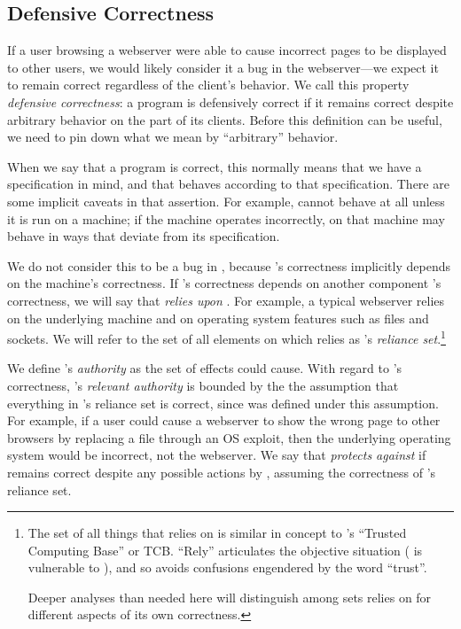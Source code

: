 \documentclass{llncs}
\begin{document}
\subsection{Defensive Correctness}

If a user browsing a webserver were able to cause incorrect pages to
be displayed to other users, we would likely consider it a bug in the
webserver---we expect it to remain correct regardless of the client's
behavior.  We call this property \emph{defensive correctness}: a
program  is defensively correct if it remains correct despite
arbitrary behavior on the part of its clients.  Before this definition
can be useful, we need to pin down what we mean by ``arbitrary''
behavior.

When we say that a program  is correct, this normally means
that we have a specification in mind, and that  behaves
according to that specification.  There are some implicit caveats in
that assertion. For example,  cannot behave at all unless it
is run on a machine; if the machine operates incorrectly,  on
that machine may behave in ways that deviate from its specification.

We do not consider this to be a bug in , because 's
correctness implicitly depends on the machine's correctness.  If
's correctness depends on another component 's
correctness, we will say that  \emph{relies upon} .
For example, a typical webserver relies on the underlying machine and
on operating system features such as files and sockets.  We will refer
to the set of all elements on which  relies as 's
\emph{reliance set}.\footnote{
%
     The set of all things that  relies on is similar in
     concept to 's ``Trusted Computing Base'' or TCB. ``Rely''
     articulates the objective situation ( is vulnerable to
     ), and so avoids confusions engendered by the word
     ``trust''.
     
     Deeper analyses than needed here will distinguish among sets
      relies on for different aspects of its own correctness.}

We define 's \emph{authority} as the set of effects 
could cause.  With regard to 's correctness, 's
\emph{relevant authority} is bounded by the the assumption that
everything in 's reliance set is correct, since  was
defined under this assumption. For example, if a user could cause a
webserver to show the wrong page to other browsers by replacing a file
through an OS exploit, then the underlying operating system would be
incorrect, not the webserver. We say that  \emph{protects
against}  if  remains correct despite any possible
actions by , assuming the correctness of 's reliance
set.
\end{document}

